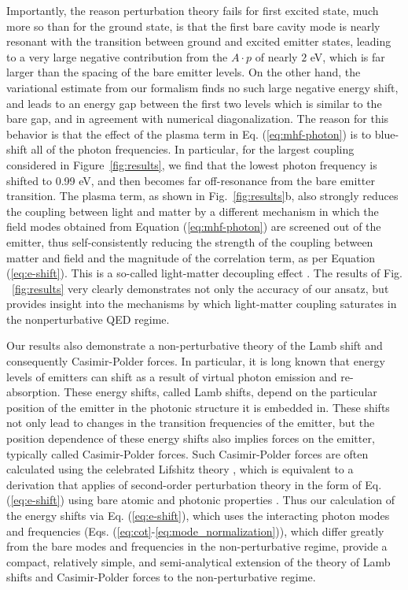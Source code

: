 \documentclass[aps,prl,twocolumn,
	groupedaddress,superscriptaddress,
	amsfonts,amssymb,amsmath,floatfix,
	citeautoscript]{revtex4-1}
\begin{document}
Importantly, the reason perturbation theory fails for first excited state, much more so than for the ground state, is that the first bare cavity mode is nearly resonant with the transition between ground and excited emitter states, leading to a very large negative contribution from the $A\cdot p$ of nearly $2$ eV, which is far larger than the spacing of the bare emitter levels. On the other hand, the variational estimate from our formalism finds no such large negative energy shift, and leads to an energy gap between the first two levels which is similar to the bare gap, and in agreement with numerical diagonalization. The reason for this behavior is that the effect of the plasma term in Eq. (\ref{eq:mhf-photon}) is to blue-shift all of the photon frequencies. In particular, for the largest coupling considered in Figure~\ref{fig:results}, we find that the lowest photon frequency is shifted to 0.99 eV, and then becomes far off-resonance from the bare emitter transition. The plasma term, as shown in Fig.~\ref{fig:results}b, also strongly reduces the coupling between light and matter by a different mechanism in which the field modes obtained from Equation (\ref{eq:mhf-photon}) are screened out of the emitter, thus self-consistently reducing the strength of the coupling between matter and field and the magnitude of the correlation term, as per Equation (\ref{eq:e-shift}). This is a so-called light-matter decoupling effect \cite{liberato2014}. The results of Fig. ~\ref{fig:results} very clearly demonstrates not only the accuracy of our ansatz, but provides insight into the mechanisms by which light-matter coupling saturates in the nonperturbative QED regime. 

Our results also demonstrate a non-perturbative theory of the Lamb shift and consequently Casimir-Polder forces. In particular, it is long known that energy levels of emitters can shift as a result of virtual photon emission and re-absorption. These energy shifts, called Lamb shifts, depend on the particular position of the emitter in the photonic structure it is embedded in. These shifts not only lead to changes in the transition frequencies of the emitter, but the position dependence of these energy shifts also implies forces on the emitter, typically called Casimir-Polder forces. Such Casimir-Polder forces are often calculated using the celebrated Lifshitz theory \cite{lifshitz1956theory}, which is equivalent to a derivation that applies of second-order perturbation theory in the form of Eq. (\ref{eq:e-shift}) using bare atomic and photonic properties \cite{scheel2009macroscopic}. Thus our calculation of the energy shifts via Eq. (\ref{eq:e-shift}), which uses the interacting photon modes and frequencies (Eqs. (\ref{eq:cot}-\ref{eq:mode_normalization})), which differ greatly from the bare modes and frequencies in the non-perturbative regime, provide a compact, relatively simple, and semi-analytical extension of the theory of Lamb shifts and Casimir-Polder forces to the non-perturbative regime.
\end{document}

